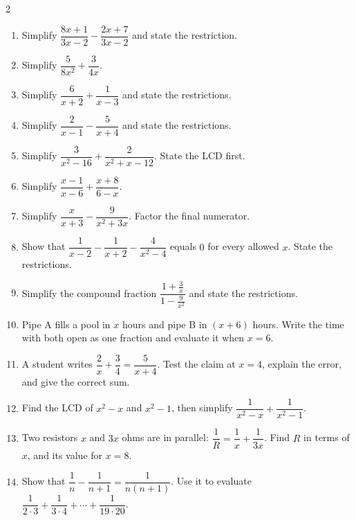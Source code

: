 \documentclass[11pt]{article}
\begin{document}
\clearpage
{}

\begin{recapbox}
\begin{multicols}{2}
\small
\begin{enumerate}[leftmargin=*,itemsep=3pt]
  \item Simplify $\dfrac{8x+1}{3x-2}-\dfrac{2x+7}{3x-2}$ and state the restriction.
  \item Simplify $\dfrac{5}{8x^2}+\dfrac{3}{4x}$.
  \item Simplify $\dfrac{6}{x+2}+\dfrac{1}{x-3}$ and state the restrictions.
  \item Simplify $\dfrac{2}{x-1}-\dfrac{5}{x+4}$ and state the restrictions.
  \item Simplify $\dfrac{3}{x^2-16}+\dfrac{2}{x^2+x-12}$. State the LCD first.
  \item Simplify $\dfrac{x-1}{x-6}+\dfrac{x+8}{6-x}$.
  \item Simplify $\dfrac{x}{x+3}-\dfrac{9}{x^2+3x}$. Factor the final numerator.
  \item Show that $\dfrac{1}{x-2}-\dfrac{1}{x+2}-\dfrac{4}{x^2-4}$ equals $0$ for every allowed $x$. State the restrictions.
  \item Simplify the compound fraction $\dfrac{1+\frac3x}{1-\frac9{x^2}}$ and state the restrictions.
  \item Pipe A fills a pool in $x$ hours and pipe B in $(x+6)$ hours. Write the time with both open as one fraction and evaluate it when $x=6$.
  \item A student writes $\dfrac2x+\dfrac34=\dfrac{5}{x+4}$. Test the claim at $x=4$, explain the error, and give the correct sum.
  \item Find the LCD of $x^2-x$ and $x^2-1$, then simplify $\dfrac{1}{x^2-x}+\dfrac{1}{x^2-1}$.
  \item Two resistors $x$ and $3x$ ohms are in parallel: $\dfrac1R=\dfrac1x+\dfrac1{3x}$. Find $R$ in terms of $x$, and its value for $x=8$.
  \item Show that $\dfrac1n-\dfrac1{n+1}=\dfrac{1}{n(n+1)}$. Use it to evaluate $\dfrac1{2\cdot3}+\dfrac1{3\cdot4}+\cdots+\dfrac1{19\cdot20}$.
\end{enumerate}
\end{multicols}
\end{recapbox}
\end{document}
